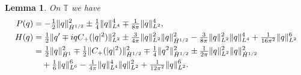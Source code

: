 \documentclass{amsart}
\numberwithin{equation}{section}
\newtheorem{lemma}[theorem]{Lemma}
\theoremstyle{definition}
\newcommand{\T}{\mathbb{T}}
\begin{document}
\begin{lemma}\label{L:P and H}
On $\T$ we have 
\begin{align*}
P(q)&=-\tfrac{1}{2}\|q\|_{\dot{H}^{1/2}}^2\pm \tfrac14\|q\|_{L^4}^4\mp\tfrac1{8\pi}\|q\|_{L^2}^4,\\
H(q)&=\tfrac12\|q'\mp i qC_+(|q|^2)\|_{L^2}^2\pm \tfrac{3}{4\pi} \|q\|_{L^2}^2\|q\|_{\dot{H}^{1/2}}^2-\tfrac{3}{8\pi}\|q\|_{L^2}^2\|q\|_{L^4}^4+\tfrac{1}{16\pi^2}\|q\|_{L^2}^6\notag\\
&= \tfrac12\|q\|_{\dot{H}^{1}}^2\mp\tfrac12\| C_+(|q|^2)\|_{\dot{H}^{1/2}}^2\mp\tfrac14\|q^2\|_{\dot{H}^{1/2}}^2\pm \tfrac1{2\pi}\|q\|_{L^2}^2\|q\|_{\dot{H}^{1/2}}^2\nonumber\\
&\quad+\tfrac{1}{6}\|q\|_{L^6}^6-\tfrac1{4\pi}\|q\|_{L^4}^4\|q\|_{L^2}^2+\tfrac{1}{12\pi^2}\|q\|_{L^2}^6.
\end{align*}
\end{lemma}
\end{document}
